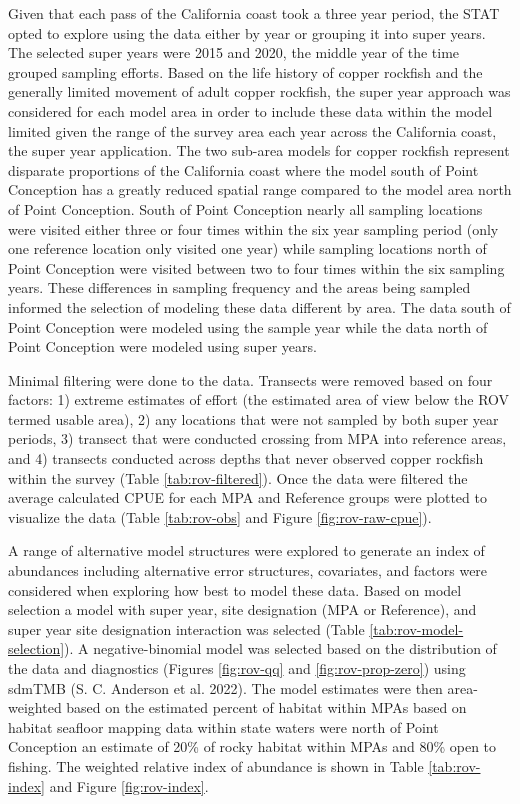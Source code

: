 \documentclass[11pt,
  english,
  letterpaper,
]{article}
\begin{document}
Given that each pass of the California coast took a three year period, the STAT opted to explore using the data either by year or grouping it into super years. The selected super years were 2015 and 2020, the middle year of the time grouped sampling efforts. Based on the life history of copper rockfish and the generally limited movement of adult copper rockfish, the super year approach was considered for each model area in order to include these data within the model limited given the range of the survey area each year across the California coast, the super year application. The two sub-area models for copper rockfish represent disparate proportions of the California coast where the model south of Point Conception has a greatly reduced spatial range compared to the model area north of Point Conception. South of Point Conception nearly all sampling locations were visited either three or four times within the six year sampling period (only one reference location only visited one year) while sampling locations north of Point Conception were visited between two to four times within the six sampling years. These differences in sampling frequency and the areas being sampled informed the selection of modeling these data different by area. The data south of Point Conception were modeled using the sample year while the data north of Point Conception were modeled using super years.

Minimal filtering were done to the data. Transects were removed based on four factors: 1) extreme estimates of effort (the estimated area of view below the ROV termed usable area), 2) any locations that were not sampled by both super year periods, 3) transect that were conducted crossing from MPA into reference areas, and 4) transects conducted across depths that never observed copper rockfish within the survey (Table \ref{tab:rov-filtered}). Once the data were filtered the average calculated CPUE for each MPA and Reference groups were plotted to visualize the data (Table \ref{tab:rov-obs} and Figure \ref{fig:rov-raw-cpue}).

A range of alternative model structures were explored to generate an index of abundances including alternative error structures, covariates, and factors were considered when exploring how best to model these data. Based on model selection a model with super year, site designation (MPA or Reference), and super year site designation interaction was selected (Table \ref{tab:rov-model-selection}). A negative-binomial model was selected based on the distribution of the data and diagnostics (Figures \ref{fig:rov-qq} and \ref{fig:rov-prop-zero}) using sdmTMB (S. C. Anderson et al. 2022). The model estimates were then area-weighted based on the estimated percent of habitat within MPAs based on habitat seafloor mapping data within state waters were north of Point Conception an estimate of 20\% of rocky habitat within MPAs and 80\% open to fishing. The weighted relative index of abundance is shown in Table \ref{tab:rov-index} and Figure \ref{fig:rov-index}.
\end{document}
